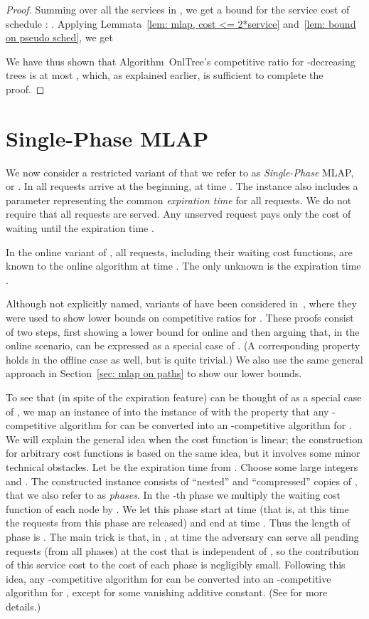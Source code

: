 \documentclass[a4paper]{article}
\newcommand{\OnAlgTreesGeneral}{{\sc OnlTree}}
\newcommand{\MLAP}{\mbox{\rm\textsf{MLAP}}}
\begin{document}
\begin{proof}
Summing over all the services  in , we get a bound for
the service cost of schedule : .  Applying Lemmata~\ref{lem: mlap,
  cost <= 2*service} and~\ref{lem: bound on pseudo sched}, we get

We have thus shown that Algorithm~{\OnAlgTreesGeneral}'s competitive
ratio for -decreasing trees is at most , which, as
explained earlier, is sufficient to complete the proof.
\end{proof}


\section{Single-Phase {\MLAP}}
\label{sec: one-phase MLAP}

We now consider a restricted variant of  that we refer to as
\emph{Single-Phase} {\MLAP}, or . In  all requests arrive at the beginning, at time . 
The instance also
includes a parameter  representing the  common \emph{expiration time}
for all requests. We do not require that all requests are served. Any unserved
request pays only the cost of waiting until the expiration time . 

In the online variant of , all requests, including their waiting cost functions,
are known to the online algorithm at time . The only unknown is the expiration time .

Although not explicitly named, variants of  have
been considered in~\cite{jrp-online-buchbinder,aggregation_wads_2013}, where they 
were used to show lower bounds on competitive ratios for . These proofs
consist of two steps, first showing a lower bound for online  and then arguing
that, in the online scenario,  can be expressed as a special case of .
(A corresponding property holds in the offline case as well, but is quite trivial.)
We also use the same general approach in Section~\ref{sec: mlap on paths} to show our lower bounds.

To see that (in spite of the expiration feature)  can be thought of as a special case
of , we map an instance  of  into the instance
 of  with the property that any -competitive algorithm for 
can be converted into an -competitive algorithm for .
We will explain the general idea when the cost function is linear; the construction
for arbitrary cost functions is based on the same idea, but it involves some minor
technical obstacles. Let  be the expiration time from .
Choose some large integers  and .  The constructed instance 
 consists of  ``nested'' and ``compressed'' copies of , that we
also refer to as \emph{phases}.
In the -th phase we multiply the waiting cost function of each node by . 
We let this phase start at time 
(that is, at this time the requests from this phase are released) and
end at time . Thus the length of phase  is .
The main trick is that, in , at time  the adversary can serve
all pending requests (from all phases) at the cost that is independent of , 
so the contribution of this service cost to the cost of each phase is negligibly small. 
Following this idea, any -competitive
algorithm for  can be converted into an -competitive algorithm
for , except for some vanishing additive constant.
(See \cite{jrp-online-buchbinder,aggregation_wads_2013} for more details.)
\end{document}
